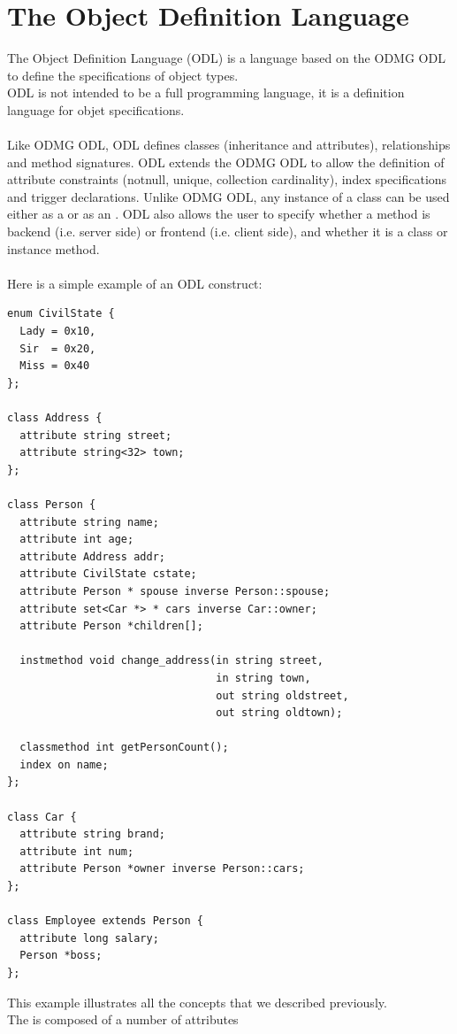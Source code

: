 \section{The Object Definition Language}
The \eyedb Object Definition Language (ODL) is a language
based on the ODMG ODL to define the specifications of object types.
\\
ODL is not intended to be a full programming language, it is a definition
language for objet specifications.
\\
\\
Like ODMG ODL, \eyedb ODL defines classes (inheritance and
attributes), relationships and method signatures.
\eyedb ODL extends the ODMG ODL to allow the definition of
attribute constraints (notnull, unique, collection cardinality), index
specifications and trigger declarations. Unlike ODMG ODL, any instance
of a class can be used either as a  or as
an . \eyedb ODL also allows the user to specify whether a method
is backend (i.e. server side) or frontend (i.e. client side),
and whether it is a class or instance method.
\\
\\
Here is a simple example of an \eyedb ODL construct:
{\verbsize
\begin{verbatim}
enum CivilState {
  Lady = 0x10,
  Sir  = 0x20,
  Miss = 0x40
};

class Address {
  attribute string street;
  attribute string<32> town;
};

class Person {
  attribute string name;
  attribute int age;
  attribute Address addr;
  attribute CivilState cstate;
  attribute Person * spouse inverse Person::spouse;
  attribute set<Car *> * cars inverse Car::owner;
  attribute Person *children[];

  instmethod void change_address(in string street,
                                 in string town,
                                 out string oldstreet,
                                 out string oldtown);

  classmethod int getPersonCount();
  index on name;
};

class Car {
  attribute string brand;
  attribute int num;
  attribute Person *owner inverse Person::cars;
};

class Employee extends Person {
  attribute long salary;
  Person *boss;
};
\end{verbatim}
}
This example illustrates all the concepts that we described
previously.
\\
The  is composed of a number of attributes
